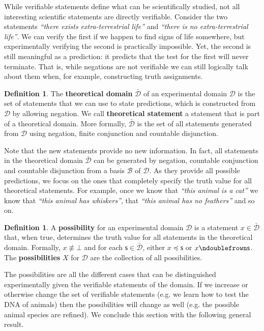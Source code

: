\documentclass[%
reprint,
amsmath,amssymb,
aps,
prx,
]{revtex4-1}
\theoremstyle{plain}%
\theoremstyle{definition}
\newtheorem{defn}[thrm]{Definition}
\theoremstyle{remark}
\def\contradiction{\bot}
\def\ncomp{\ndoublefrown}
\def\narrower{\preccurlyeq}
\newcommand{\edomain}[1][D] {\mathcal{#1}}
\newcommand{\tdomain}[1][D] {\bar{\mathcal{#1}}}
\newcommand{\basis}[1][B] {\mathcal{#1}} %
\newcommand{\statement}[1] {\emph{``#1''}}
\begin{document}
While verifiable statements define what can be scientifically studied, not all interesting scientific statements are directly verifiable. Consider the two statements \statement{there exists extra-terrestrial life} and \statement{there is no extra-terrestrial life}. We can verify the first if we happen to find signs of life somewhere, but experimentally verifying the second is practically impossible. Yet, the second is still meaningful as a prediction: it predicts that the test for the first will never terminate. That is, while negations are not verifiable we can still logically talk about them when, for example, constructing truth assignments.

\begin{defn}
	The \textbf{theoretical domain} $\tdomain$ of an experimental domain $\edomain$ is the set of statements that we can use to state predictions, which is constructed from $\edomain$ by allowing negation. We call \textbf{theoretical statement} a statement that is part of a theoretical domain. More formally, $\tdomain$ is the set of all statements generated from $\edomain$ using negation, finite conjunction and countable disjunction.
\end{defn}

Note that the new statements provide no new information. In fact, all statements in the theoretical domain $\tdomain$ can be generated by negation, countable conjunction and countable disjunction from a basis $\basis$ of $\edomain$. As they provide all possible predictions, we focus on the ones that completely specify the truth value for all theoretical statements. For example, once we know that \statement{this animal is a cat} we know that \statement{this animal has whiskers}, that \statement{this animal has no feathers} and so on.

\begin{defn}
	A \textbf{possibility} for an experimental domain $\edomain$ is a statement $x \in \tdomain$ that, when true, determines the truth value for all statements in the theoretical domain. Formally, $x \nequiv \contradiction$ and for each $\mathsf{s} \in \tdomain$, either $x \narrower \mathsf{s}$ or $x \ncomp \mathsf{s}$. The \textbf{possibilities} $X$ for $\edomain$ are the collection of all possibilities.
\end{defn}

The possibilities are all the different cases that can be distinguished experimentally given the verifiable statements of the domain. If we increase or otherwise change the set of verifiable statements (e.g. we learn how to test the DNA of animals) then the possibilities will change as well (e.g. the possible animal species are refined). We conclude this section with the following general result.
\end{document}
